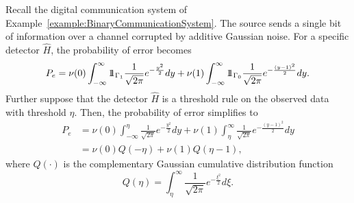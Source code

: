 \begin{example} \label{example:BinaryCommunicationSystemII}
Recall the digital communication system of Example~\ref{example:BinaryCommunicationSystem}.
The source sends a single bit of information over a channel corrupted by additive Gaussian noise.
For a specific detector $\hat{H}$, the probability of error becomes
\begin{equation*}
P_e
=  \nu(0) \int_{-\infty}^{\infty} \mathrm{1\!\!1}_{ \Gamma_1 }
\frac{1}{\sqrt{2 \pi}} e^{- \frac{y^2}{2}} dy
+ \nu(1) \int_{-\infty}^{\infty} \mathrm{1\!\!1}_{ \Gamma_0 }
\frac{1}{\sqrt{2 \pi}} e^{- \frac{(y-1)^2}{2}} dy .
\end{equation*}
Further suppose that the detector $\hat{H}$ is a threshold rule on the observed data with threshold $\eta$.
Then, the probability of error simplifies to
\begin{equation*}
\begin{split}
P_e
&=  \nu(0) \int_{-\infty}^{\eta} \frac{1}{\sqrt{2 \pi}} e^{- \frac{y^2}{2}} dy
+ \nu(1) \int_{\eta}^{\infty} \frac{1}{\sqrt{2 \pi}} e^{- \frac{(y-1)^2}{2}} dy \\
&= \nu(0) Q (-\eta) + \nu(1) Q (\eta - 1),
\end{split}
\end{equation*}
where $Q(\cdot)$ is the complementary Gaussian cumulative distribution function
\begin{equation}
Q (\eta) = \int_{\eta}^{\infty} \frac{1}{\sqrt{2 \pi}}
e^{- \frac{\xi^2}{2}} d\xi.
\end{equation}
\end{example}

